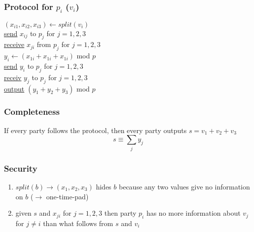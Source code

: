 \documentclass{report}
\begin{document}
\begin{adjustwidth}{2em}{2em}
\begin{adjustwidth}{2em}{2em}
 		\subsubsection{Protocol for $p_i$ ($v_i$)}
 		\begin{adjustwidth}{2em}{}
 			$(x_{i1}, x_{i2}, x_{i3}) \leftarrow split(v_i)$ \\
 			\underline{send} $x_{ij}$ to $p_j$ for $j = 1,2,3$ \\
 			\underline{receive} $x_{ji}$ from $p_j$ for $j = 1,2,3$ \\
 			$y_i \leftarrow (x_{1i} + x_{1i} + x_{1i})$ mod $p$ \\
 			\underline{send} $y_i$ to $p_j$ for $j = 1,2,3$ \\
 			\underline{receiv} $y_j$ to $p_j$ for $j = 1,2,3$ \\
 			\underline{output} $(y_1 + y_2 + y_3)$ mod $p$
 		\end{adjustwidth}
 		\subsubsection{Completeness}
 		\begin{adjustwidth}{2em}{}
 			If every party follows the protocol, then every party outputs $s = v_1 + v_2 + v_3$
 			\[
 				s \equiv \sum_j y_j
 			\]
 		\end{adjustwidth}
 		\subsubsection{Security}
 		\begin{adjustwidth}{2em}{}
 			\begin{enumerate}
 				\item $split(b) \rightarrow (x_1, x_2, x_3)$ hides $b$ because any two values give no information on $b$ ($\rightarrow$ one-time-pad)
 				\item given $s$ and $x_{ji}$ for $j = 1,2,3$ then party $p_i$ has no more information about $v_j$ for $j \neq i$ than what follows from $s$ and $v_i$
 			\end{enumerate} 			
 		\end{adjustwidth}
 	\end{adjustwidth}
 \end{adjustwidth}
 
\end{document}
